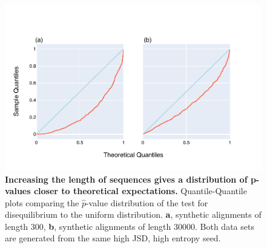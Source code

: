 \begin{figure}[!ht]
\centering
\includegraphics[width=\textwidth]{figures/plots/synthetic/lrt/197113_332182_17210-long_seq.pdf}
\caption{\textbf{Increasing the length of sequences gives a distribution of p-values closer to theoretical expectations.} Quantile-Quantile plots comparing the $\hat p$-value distribution of the test for disequilibrium to the uniform distribution. \textbf{a}, synthetic alignments of length 300, \textbf{b}, synthetic alignments of length 30000. Both data sets are generated from the same high JSD, high entropy seed.}
\label{fig:synthetic/lrt/197113-long_seq}
\end{figure}